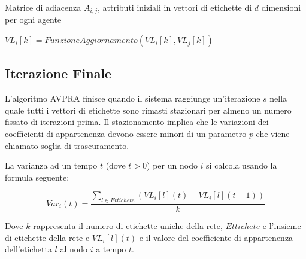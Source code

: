 \documentclass[a4paper,12pt]{report}
\begin{document}
		\begin{algorithmic}
			\REQUIRE Matrice di adiacenza $A_{i, j}$, attributi iniziali in vettori di etichette di $d$ dimensioni per ogni agente


				\STATE {}

					
					\STATE {}


						\STATE {}

							\STATE $VL_i[k] = FunzioneAggiornamento(VL_i[k], VL_j[k])$

						\ENDIF
					\ENDFOR
				\ENDFOR	
			\ENDFOR
		\end{algorithmic}

		\subsection{Iterazione Finale}
		L'algoritmo AVPRA finisce quando il sistema raggiunge un'iterazione $s$ nella quale tutti i vettori di etichette sono rimasti stazionari per almeno un numero fissato di iterazioni prima. Il stazionamento implica che le variazioni dei coefficienti di appartenenza devono essere minori di un parametro $p$ che viene chiamato soglia di trascuramento.  \cite{avpra}

		La varianza ad un tempo $t$ (dove $t > 0$) per un nodo $i$ si calcola usando la formula seguente:
		
		\begin{equation}
			Var_i(t) = \frac{\sum_{l \in Ettichete} (VL_i[l](t) - VL_i[l](t-1))}{k}
		\end{equation}

		Dove $k$ rappresenta il numero di etichette uniche della rete, $Ettichete$ e l'insieme di etichette della rete e $VL_i[l](t)$ e il valore del coefficiente di appartenenza dell'etichetta $l$ al nodo $i$ a tempo $t$.
\end{document}
